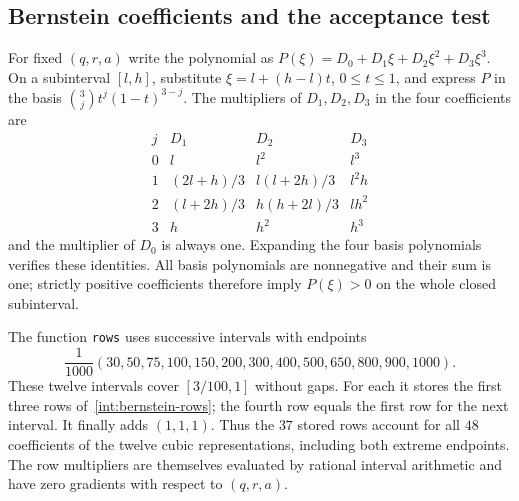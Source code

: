 \subsection{Bernstein coefficients and the acceptance test}
\label{int:bernstein}

For fixed $(q,r,a)$ write the polynomial as
$P(\xi)=D_0+D_1\xi+D_2\xi^2+D_3\xi^3$.  On a subinterval
$[l,h]$, substitute $\xi=l+(h-l)t$, $0\le t\le1$, and express $P$
in the basis $\binom3j t^j(1-t)^{3-j}$.  The multipliers of $D_1,D_2,D_3$
in the four coefficients are
\begin{equation}
 \begin{array}{c|ccc}
 j& D_1&D_2&D_3\\ \hline
 0&l&l^2&l^3\\
 1&(2l+h)/3&l(l+2h)/3&l^2h\\
 2&(l+2h)/3&h(h+2l)/3&lh^2\\
 3&h&h^2&h^3
 \end{array}
 \label{int:bernstein-rows}
\end{equation}
and the multiplier of $D_0$ is always one.  Expanding the four
basis polynomials verifies these identities.  All basis polynomials
are nonnegative and their sum is one; strictly positive coefficients
therefore imply $P(\xi)>0$ on the whole closed subinterval.

The function \texttt{rows} uses successive intervals with endpoints
\begin{equation}
 \frac1{1000}(30,50,75,100,150,200,300,400,500,650,800,900,1000).
 \label{int:xi-grid}
\end{equation}
These twelve intervals cover $[3/100,1]$ without gaps.  For each it
stores the first three rows of~\eqref{int:bernstein-rows}; the fourth
row equals the first row for the next interval.  It finally adds
$(1,1,1)$.  Thus the $37$ stored rows account for all $48$ coefficients
of the twelve cubic representations, including both extreme
endpoints.  The row multipliers are themselves evaluated by rational
interval arithmetic and have zero gradients with respect to
$(q,r,a)$.

